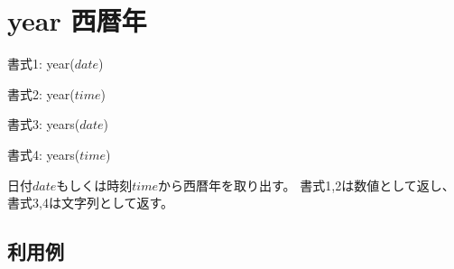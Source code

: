 
%

\section{year 西暦年\label{sect:year}}

書式1: year($date$)

書式2: year($time$)

書式3: years($date$)

書式4: years($time$)


日付$date$もしくは時刻$time$から西暦年を取り出す。
書式1,2は数値として返し、書式3,4は文字列として返す。

\subsection*{利用例}


%


